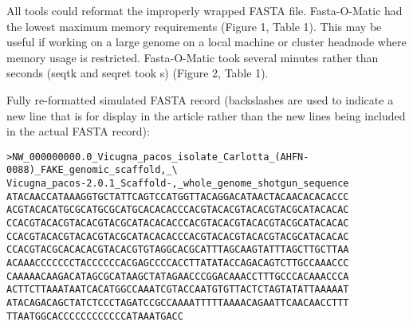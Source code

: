 All tools could reformat the improperly wrapped FASTA file. Fasta-O-Matic had the lowest maximum memory requirements (Figure 1, Table 1). This may be useful if working on a large genome on a local machine or cluster headnode where memory usage is restricted. Fasta-O-Matic took several minutes rather than seconds (seqtk and seqret took  s) (Figure 2, Table 1). 

Fully re-formatted simulated FASTA record (backslashes are used to indicate a new line that is for display in the article rather than the new lines being included in the actual FASTA record):
\begin{verbatim}
>NW_000000000.0_Vicugna_pacos_isolate_Carlotta_(AHFN-0088)_FAKE_genomic_scaffold,_\
Vicugna_pacos-2.0.1_Scaffold-,_whole_genome_shotgun_sequence
ATACAACCATAAAGGTGCTATTCAGTCCATGGTTACAGGACATAACTACAACACACACCC
ACGTACACATGCGCATGCGCATGCACACACCCACGTACACGTACACGTACGCATACACAC
CCACGTACACGTACACGTACGCATACACACCCACGTACACGTACACGTACGCATACACAC
CCACGTACACGTACACGTACGCATACACACCCACGTACACGTACACGTACGCATACACAC
CCACGTACGCACACACGTACACGTGTAGGCACGCATTTAGCAAGTATTTAGCTTGCTTAA
ACAAACCCCCCCTACCCCCCACGAGCCCCACCTTATATACCAGACAGTCTTGCCAAACCC
CAAAAACAAGACATAGCGCATAAGCTATAGAACCCGGACAAACCTTTGCCCACAAACCCA
ACTTCTTAAATAATCACATGGCCAAATCGTACCAATGTGTTACTCTAGTATATTAAAAAT
ATACAGACAGCTATCTCCCTAGATCCGCCAAAATTTTTAAAACAGAATTCAACAACCTTT
TTAATGGCACCCCCCCCCCCCATAAATGACC
\end{verbatim}
  
  
  
  
  
  
  
  
  
  
  
  